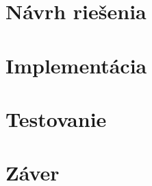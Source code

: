 \chapter{Návrh riešenia}

\chapter{Implementácia}

\chapter{Testovanie}

\chapter{Záver}












